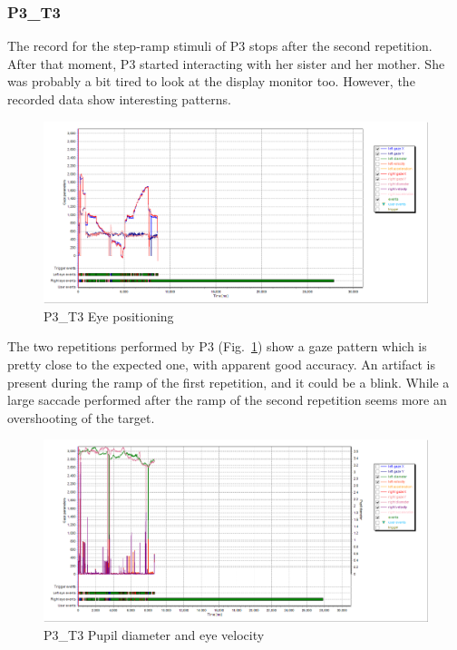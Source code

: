 \subsubsection{P3\_T3}
\label{sec:P3_T3}

The record for the step-ramp stimuli of P3 stops after the second repetition. After that moment, P3 started interacting with her sister and her mother. She was probably a bit tired to look at the display monitor too. However, the recorded data show interesting patterns.

\begin{figure}[h]
  \centering
  \includegraphics[width=.8\textwidth]{figures/graphs/P3_T3(stepRamp)_XY.png}
  \caption[P3\_T3 Eye positioning]{P3\_T3 Eye positioning}
  \label{fig:P3_T3_pos}
\end{figure}

The two repetitions performed by P3 (Fig.~\ref{fig:P3_T3_pos})  show a gaze pattern which is pretty close to the expected one, with apparent good accuracy. An artifact is present during the ramp of the first repetition, and it could be a blink. While a large saccade performed after the ramp of the second repetition seems more an overshooting of the target.

\begin{figure}[h]
  \centering
  \includegraphics[width=.8\textwidth]{figures/graphs/P3_T3(stepRamp)_VP.png}
  \caption[P3\_T3 pupil velocity]{P3\_T3 Pupil diameter and eye velocity}
  \label{fig:P3_T3_vel}
\end{figure}

